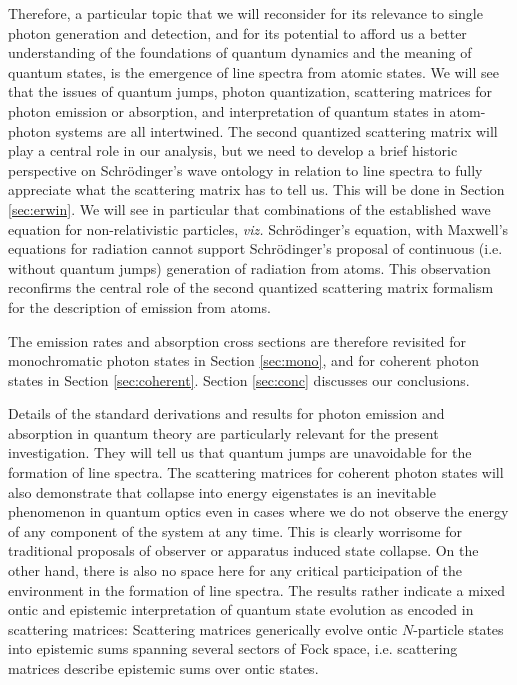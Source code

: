 \documentclass[final,3p,12pt]{elsarticle3}
\begin{document}
Therefore, a particular topic that we will reconsider for its relevance to 
single photon generation and detection, and for its potential to afford us a 
better understanding of the foundations of quantum dynamics and the meaning of 
quantum states, is the emergence of line spectra from atomic states. We will see 
that the issues of quantum jumps, photon quantization, scattering matrices for 
photon emission or absorption, and interpretation of quantum states in atom-photon 
systems are all intertwined. The second quantized scattering matrix will play a 
central role in our analysis, but we need to develop a brief historic perspective 
on Schr\"odinger's wave ontology in relation to line spectra to fully appreciate 
what the scattering matrix has to tell us. This will be done in Section \ref{sec:erwin}.
We will see in particular that combinations of the established wave equation for
non-relativistic particles, \textit{viz.} Schr\"odinger's equation, with Maxwell's 
equations for radiation cannot support Schr\"odinger's proposal of continuous
(i.e. without quantum jumps) generation of radiation from atoms. This observation
reconfirms the central role of the second quantized scattering matrix formalism for
the description of emission from atoms. 

The emission rates and absorption cross sections are therefore revisited for 
mono\-chro\-matic photon states in Section \ref{sec:mono}, and for coherent photon 
states in Section \ref{sec:coherent}. Section \ref{sec:conc} discusses our conclusions.

Details of the standard derivations and results for photon emission and absorption 
in quantum theory are particularly relevant for the present investigation.
They will tell us that quantum jumps are unavoidable for the formation of line
spectra. The scattering matrices for coherent photon states will also
demonstrate that collapse into energy eigenstates is an inevitable phenomenon
in quantum optics even in cases where we do not observe the energy of any 
component of the system at any time. This is clearly worrisome for traditional
proposals of observer or apparatus induced state collapse. On the other hand,
there is also no space here for any critical participation of the environment
in the formation of line spectra. The results rather indicate a mixed ontic
and epistemic interpretation of quantum state evolution as encoded in scattering
matrices: Scattering matrices generically evolve ontic $N$-particle states
into epistemic sums spanning several sectors of Fock space, i.e. scattering
matrices describe epistemic sums over ontic states.
\end{document}
